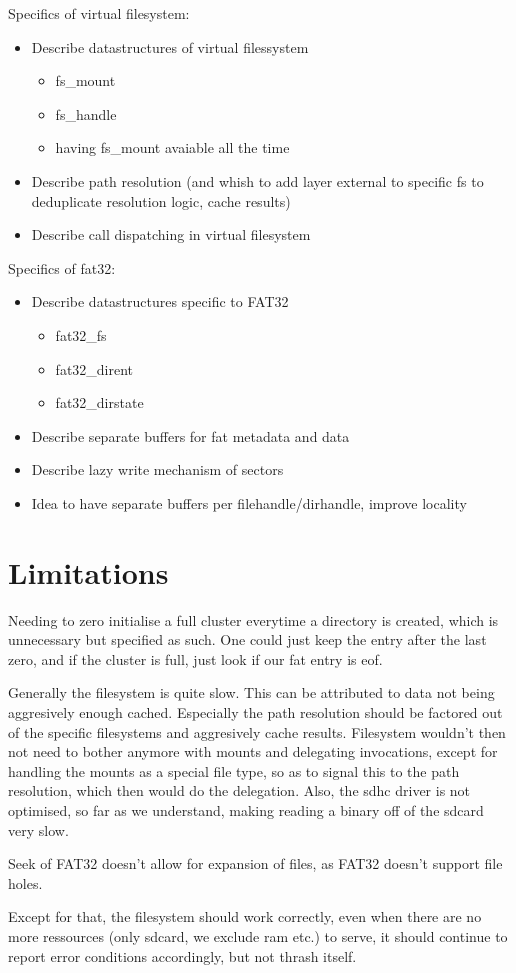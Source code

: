 Specifics of virtual filesystem:
\begin{itemize}
	\item Describe datastructures of virtual filessystem
	\begin{itemize}
		\item fs\_mount
		\item fs\_handle
		\item having fs\_mount avaiable all the time
	\end{itemize}
	\item Describe path resolution (and whish to add layer external to specific
				fs to deduplicate resolution logic, cache results)
	\item Describe call dispatching in virtual filesystem
\end{itemize}

Specifics of fat32:
\begin{itemize}
	\item Describe datastructures specific to FAT32
	\begin{itemize}
		\item fat32\_fs
		\item fat32\_dirent
		\item fat32\_dirstate
	\end{itemize}
	\item Describe separate buffers for fat metadata and data
	\item Describe lazy write mechanism of sectors
	\item Idea to have separate buffers per filehandle/dirhandle, improve locality
\end{itemize}

\section{Limitations}

Needing to zero initialise a full cluster everytime a directory is created,
which is unnecessary but specified as such.
One could just keep the entry after the last zero, and if the cluster is full,
just look if our fat entry is eof.

Generally the filesystem is quite slow.
This can be attributed to data not being aggresively enough cached.
Especially the path resolution should be factored out of the specific
filesystems and aggresively cache results.
Filesystem wouldn't then not need to bother anymore with mounts and delegating
invocations, except for handling the mounts as a special file type, so as to
signal this to the path resolution, which then would do the delegation.
Also, the sdhc driver is not optimised, so far as we understand, making reading
a binary off of the sdcard very slow.

Seek of FAT32 doesn't allow for expansion of files, as FAT32 doesn't support
file holes.

Except for that, the filesystem should work correctly, even when there are no
more ressources (only sdcard, we exclude ram etc.) to serve, it should continue
to report error conditions accordingly, but not thrash itself.
